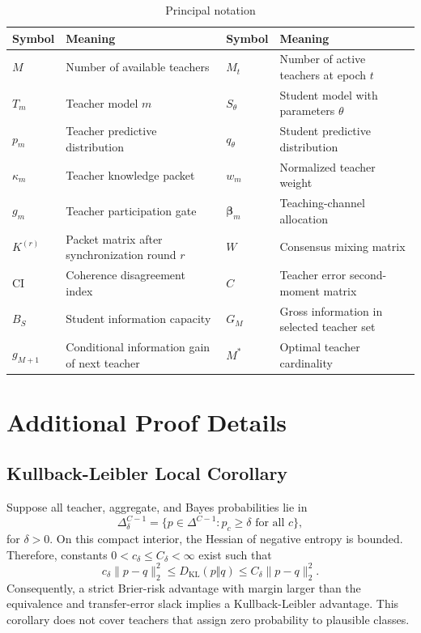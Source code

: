 \documentclass[10pt,twocolumn,a4paper]{article}
\newcommand{\KL}{D_{\mathrm{KL}}}
\newcommand{\simplex}{\Delta}
\begin{document}
\begin{table}[t]
\caption{Principal notation}
\label{tab:notation}
\centering
\small
\begin{tabularx}{0.96\textwidth}{@{}p{}X p{}X@{}}
\toprule
Symbol & Meaning & Symbol & Meaning \\
\midrule
\(M\) & Number of available teachers & \(M_t\) & Number of active teachers at epoch \(t\) \\
\(T_m\) & Teacher model \(m\) & \(S_\theta\) & Student model with parameters \(\theta\) \\
\(p_m\) & Teacher predictive distribution & \(q_\theta\) & Student predictive distribution \\
\(\kappa_m\) & Teacher knowledge packet & \(w_m\) & Normalized teacher weight \\
\(g_m\) & Teacher participation gate & \(\bm\beta_m\) & Teaching-channel allocation \\
\(K^{(r)}\) & Packet matrix after synchronization round \(r\) & \(W\) & Consensus mixing matrix \\
\(\mathrm{CI}\) & Coherence disagreement index & \(C\) & Teacher error second-moment matrix \\
\(B_S\) & Student information capacity & \(G_M\) & Gross information in selected teacher set \\
\(g_{M+1}\) & Conditional information gain of next teacher & \(M^*\) & Optimal teacher cardinality \\
\bottomrule
\end{tabularx}
\end{table}

\section{Additional Proof Details}

\subsection{Kullback-Leibler Local Corollary}

Suppose all teacher, aggregate, and Bayes probabilities lie in
\begin{equation}
 \simplex_\delta^{C-1}=\{p\in\simplex^{C-1}:p_c\ge\delta\text{ for all }c\},
\end{equation}
for \(\delta>0\). On this compact interior, the Hessian of negative entropy is bounded. Therefore, constants \(0<c_\delta\le C_\delta<\infty\) exist such that
\begin{equation}
 c_\delta\|p-q\|_2^2
 \le\KL(p\Vert q)
 \le C_\delta\|p-q\|_2^2.
\label{eq:klequiv}
\end{equation}
Consequently, a strict Brier-risk advantage with margin larger than the equivalence and transfer-error slack implies a Kullback-Leibler advantage. This corollary does not cover teachers that assign zero probability to plausible classes.
\end{document}
